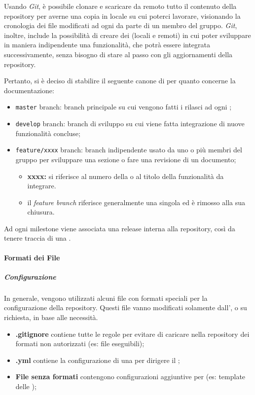 	Usando \textit{Git}, è possibile clonare e scaricare da remoto tutto il contenuto della repository per averne una copia in locale su cui poterci lavorare, visionando la cronologia dei file modificati ad ogni  da parte di un membro del gruppo.
	\textit{Git}, inoltre, include la possibilità di creare dei  (locali e remoti) in cui poter sviluppare in maniera indipendente una funzionalità, che potrà essere integrata successivamente, senza bisogno di stare al passo con gli aggiornamenti della repository.

	Pertanto, si è deciso di stabilire il seguente canone di  per quanto concerne la documentazione:
	\begin{itemize}
		\item \verb!master! branch: branch principale su cui vengono fatti i rilasci ad ogni ;
		\item \verb!develop! branch: branch di sviluppo su cui viene fatta integrazione di nuove funzionalità concluse;
		\item \verb!feature/xxxx! branch: branch indipendente usato da uno o più membri del gruppo per sviluppare una sezione o fare una revisione di un documento;
		\begin{itemize}
			\item \textbf{xxxx:} si riferisce al numero della  o al titolo della funzionalità da integrare.
			\item il \textit{feature branch} riferisce generalmente una singola  ed è rimosso alla sua chiusura.
		\end{itemize}
	\end{itemize}

	Ad ogni milestone viene associata una release interna alla repository, così da tenere traccia di una .

	\paragraph{Formati dei File}

		\subparagraph{Configurazione}

		In generale, vengono utilizzati alcuni file con formati speciali per la configurazione della repository. Questi file vanno modificati solamente dall', o su richiesta, in base alle necessità.
		\begin{itemize}
			\item \textbf{.gitignore} contiene tutte le regole per evitare di caricare nella repository dei formati non autorizzati (es: file eseguibili);
			\item \textbf{.yml} contiene la configurazione di una  per dirigere il ;
			\item \textbf{File senza formati} contengono configurazioni aggiuntive per  (es: template delle );
		\end{itemize}

